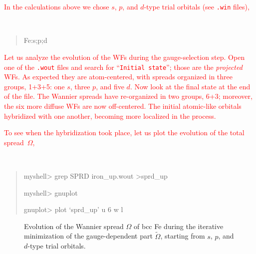 \documentclass[a4paper,11pt,twoside]{article}
\def\tent#1{\textcolor{red}{#1}}     %
\begin{document}
\tent{In the calculations above we chose $s$, $p$, and $d$-type trial
  orbitals (see {\tt .win} files),} {\tt
\begin{quote}
Fe:s;p;d

\end{quote}
}\tent{Let us analyze the evolution of the WFs during the
  gauge-selection step. Open one of the {\tt .wout} files and search
  for ``{\tt Initial state}''; those are the {\it projected} WFs. As
  expected they are atom-centered, with spreads organized in three
  groups, 1+3+5: one $s$, three $p$, and five $d$.  Now look at the
  final state at the end of the file.  The Wannier spreads have
  re-organized in two groups, 6+3; moreover, the six more diffuse WFs
  are now off-centered. The initial atomic-like orbitals hybridized
  with one another, becoming more localized in the process.}

\tent{To see when the hybridization took place, let us plot the
  evolution of the total spread~$\Omega$,} 
{\tt
\begin{quote}
myshell> grep SPRD iron\_up.wout >sprd\_up

myshell> gnuplot

gnuplot> plot `sprd\_up' u 6  w l

\end{quote}
}

\begin{figure}[h]
\begin{center}
\caption{Evolution of the Wannier spread $\Omega$ of bcc Fe during the
  iterative minimization of the gauge-dependent part
  $\widetilde{\Omega}$, starting from $s$, $p$, and $d$-type trial
  orbitals.}
\label{fig:Fe-sprd}
\end{center}
\end{figure}
\end{document}
